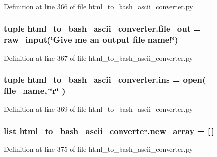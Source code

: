 Definition at line 366 of file html\-\_\-to\-\_\-bash\-\_\-ascii\-\_\-converter.\-py.

\subsubsection[{file\-\_\-out}]{\setlength{\rightskip}{0pt plus 5cm}tuple html\-\_\-to\-\_\-bash\-\_\-ascii\-\_\-converter.\-file\-\_\-out = raw\-\_\-input(\char`\"{}Give me an output {\bf file} name!\char`\"{})}\label{namespacehtml__to__bash__ascii__converter_a1c2d3151ba54e82095aeb258aad527ea}


Definition at line 367 of file html\-\_\-to\-\_\-bash\-\_\-ascii\-\_\-converter.\-py.

\subsubsection[{ins}]{\setlength{\rightskip}{0pt plus 5cm}tuple html\-\_\-to\-\_\-bash\-\_\-ascii\-\_\-converter.\-ins = open( {\bf file\-\_\-name}, \char`\"{}r\char`\"{} )}\label{namespacehtml__to__bash__ascii__converter_afb34cd1d39ae35f71c6a5d6d0b7419e3}


Definition at line 369 of file html\-\_\-to\-\_\-bash\-\_\-ascii\-\_\-converter.\-py.

\subsubsection[{new\-\_\-array}]{\setlength{\rightskip}{0pt plus 5cm}list html\-\_\-to\-\_\-bash\-\_\-ascii\-\_\-converter.\-new\-\_\-array = \mbox{[}$\,$\mbox{]}}\label{namespacehtml__to__bash__ascii__converter_ad4cf37b49af00dca8d9496f17fdae9e7}


Definition at line 375 of file html\-\_\-to\-\_\-bash\-\_\-ascii\-\_\-converter.\-py.

